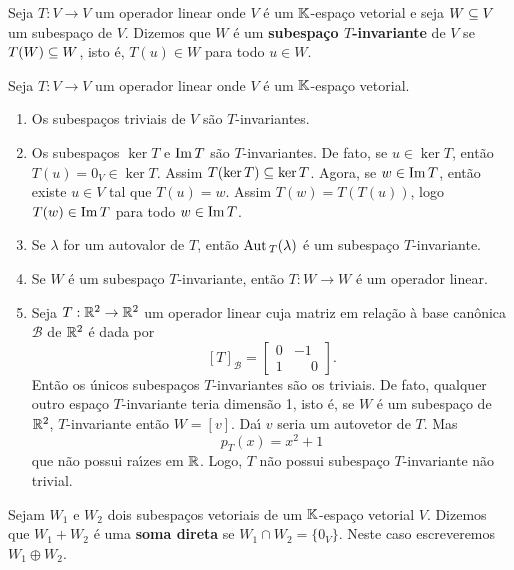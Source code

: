 \begin{definicao}
    Seja $T : V \to V$ um operador linear onde $V$ \'e um $\mathbb{K}$-espa\c{c}o vetorial e seja $W \subseteq V$ um subespa\c{c}o de $V$. Dizemos que $W$ \'e um \textbf{subespa\c{c}o $T$-invariante} de $V$ se $T(W) \subseteq W$, isto \'e, $T(u) \in W$ para todo $u \in W$.
\end{definicao}

\begin{exemplo}
Seja $T : V \to V$ um operador linear onde $V$ \'e um $\mathbb{K}$-espa\c{c}o vetorial.
    \begin{enumerate}[label={\arabic*})]
        \item Os subespa\c{c}os triviais de $V$ s\~ao $T$-invariantes.
        \item Os subespa\c{c}os $\ker T$ e ${\rm Im\,} T$ s\~ao $T$-invariantes. De fato, se $u \in \ker T$, ent\~ao $T(u) = 0_V \in \ker T$. Assim $T(\ker T) \subseteq \ker T$. Agora, se $w \in {\rm Im\,} T$, ent\~ao existe $u \in V$ tal que $T(u) = w$. Assim $T(w) = T(T(u))$, logo $T(w) \in {\rm Im\,} T$ para todo $w \in {\rm Im\,} T$.
        \item Se $\lambda$ for um autovalor de $T$, ent\~ao ${\rm Aut\,}_T(\lambda)$ \'e um subespa\c{c}o $T$-invariante.
        \item Se $W$ \'e um subespa\c{c}o $T$-invariante, ent\~ao $T : W \to W$ \'e um operador linear.
        \item Seja $T : \mathbb{R}^2 \to \mathbb{R}^2$ um operador linear cuja matriz em rela\c{c}\~ao \`a base can\^onica $\mathcal{B}$ de $\mathbb{R}^2$ \'e dada por
        \[
            [T]_\mathcal{B} = \begin{bmatrix}
                0 & -1\\
                1 & \phantom{-}0
            \end{bmatrix}.
        \]
        Ent\~ao os \'unicos subespa\c{c}os $T$-invariantes s\~ao os triviais. De fato, qualquer outro espa\c{c}o $T$-invariante teria dimens\~ao 1, isto \'e, se $W$ \'e um subespa\c{c}o de $\mathbb{R}^2$, $T$-invariante ent\~ao $W = [v]$. Da{\'\i} $v$ seria um autovetor de $T$. Mas
        \[
            p_T(x) = x^2 + 1
        \]
        que n\~ao possui ra{\'\i}zes em $\mathbb{R}$. Logo, $T$ n\~ao possui subespa\c{c}o $T$-invariante n\~ao trivial.
    \end{enumerate}
\end{exemplo}

\begin{definicao}
    Sejam $W_1$ e $W_2$ dois subespa\c{c}os vetoriais de um $\mathbb{K}$-espa\c{c}o vetorial $V$. Dizemos que $W_1 + W_2$ \'e uma \textbf{soma direta} se $W_1 \cap W_2 = \{0_V\}$. Neste caso escreveremos $W_1 \oplus W_2$.
\end{definicao}

